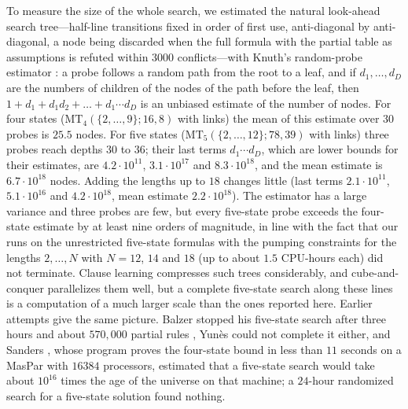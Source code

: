 To measure the size of the whole search, we estimated the natural
look-ahead search tree---half-line transitions fixed in order of first use,
anti-diagonal by anti-diagonal, a node being discarded when the full
formula with the partial table as assumptions is refuted within $3000$
conflicts---with Knuth's random-probe estimator \cite{Knuth75}: a probe
follows a random path from the root to a leaf, and if $d_1,\dots,d_D$ are
the numbers of children of the nodes of the path before the leaf, then
$1+d_1+d_1d_2+\dots+d_1\cdots d_D$ is an unbiased estimate of the number of
nodes. For four states ($\mathrm{MT}_4(\{2,\dots,9\};16,8)$ with links) the
mean of this estimate over $30$ probes is $25.5$ nodes. For five states
($\mathrm{MT}_5(\{2,\dots,12\};78,39)$ with links) three probes reach depths
$30$ to $36$; their last terms $d_1\cdots d_D$, which are lower bounds for
their estimates, are $4.2\cdot10^{11}$, $3.1\cdot10^{17}$ and
$8.3\cdot10^{18}$, and the mean estimate is $6.7\cdot10^{18}$ nodes. Adding
the lengths up to $18$ changes little (last terms $2.1\cdot10^{11}$,
$5.1\cdot10^{16}$ and $4.2\cdot10^{18}$, mean estimate $2.2\cdot10^{18}$).
The estimator has a large variance and three probes are few, but every
five-state probe exceeds the four-state estimate by at least nine orders
of magnitude, in line with the fact that
our runs on the unrestricted five-state formulas with the pumping
constraints for the lengths $2,\dots,N$ with $N=12$, $14$ and $18$ (up to
about $1.5$ CPU-hours each) did not terminate. Clause learning compresses
such trees considerably, and cube-and-conquer \cite{HeuleEtAl11}
parallelizes them well, but a complete five-state search along these lines
is a computation of a much larger scale than the ones reported here.
Earlier attempts give the same picture. Balzer stopped his five-state
search after three hours and about $570{,}000$ partial rules
\cite[p.~36]{Balzer67}, Yun\`es \cite[\S3.1]{Yunes93} could not complete
it either, and Sanders \cite{Sanders94},
whose program proves the four-state bound in less than $11$ seconds on a
MasPar with $16384$ processors, estimated that a five-state search would
take about $10^{16}$ times the age of the universe on that machine; a
$24$-hour randomized search for a five-state solution found nothing.
